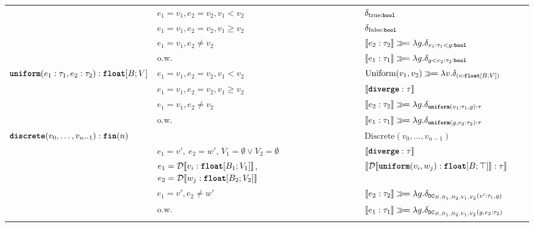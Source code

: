 \begin{table}[t]
\begin{center}
\begin{adjustbox}{width=\textwidth}
\begin{tabular}{l l l l l}
			& $e_1 = v_1, e_2 = v_2, v_1 < v_2 $ & $\delta_{\textnormal{true} : \textnormal{\ttfamily\bfseries bool}}$ \\
			& $e_1 = v_1, e_2 = v_2, v_1 \geq v_2$ & $\delta_{\textnormal{false} : \textnormal{\ttfamily\bfseries bool}}$  \\
			&$e_1 = v_1, e_2 \neq v_2$ & $\llbracket  e_2 : \tau_2  \rrbracket \gg\!= \lambda g. \delta_{ v_1 : \tau_1 < g : \textnormal{\ttfamily\bfseries bool}}$ \\
			& o.w.\ & $\llbracket  e_1 : \tau_1  \rrbracket \gg\!= \lambda g. \delta_{ g < e_2 : \tau_2 : \textnormal{\ttfamily\bfseries bool}}$  \\
			\midrule
			
			& $e_1 = v_1, e_2 = v_2, v_1 < v_2$ & $\text{Uniform}(v_1, v_2) \gg\!= \lambda v. \delta_{(v : \mathnormal{\textnormal{\ttfamily\bfseries float}}[B; V])}$ \\
			& $e_1 = v_1, e_2 = v_2, v_1 \geq v_2$ & $\llbracket \textnormal{\ttfamily\bfseries diverge} : \tau \rrbracket$ \\
			& $e_1 = v_1, e_2 \neq v_2$ & $\llbracket  e_2 : \tau_2  \rrbracket \gg\!= \lambda g. \delta_{ \textnormal{\ttfamily\bfseries uniform}(v_1 : \tau_1, g) : \tau }$ \\
			& o.w.\ & $\llbracket  e_1 : \tau_1  \rrbracket \gg\!= \lambda g. \delta_{ \textnormal{\ttfamily\bfseries uniform}(g, e_2 : \tau_2) : \tau } $ \\
			\midrule
			
			& & $\text{Discrete}{(v_0, \ldots, v_{n-1})}$  \\
			\midrule 
			
			&  & $\llbracket \textnormal{\ttfamily\bfseries diverge} : \tau \rrbracket$ \\
			&  & $\llbracket \mathcal{D}\llbracket \textnormal{\ttfamily\bfseries uniform}(v_i, w_j) : \mathnormal{\textnormal{\ttfamily\bfseries float}}[B; \top] \rrbracket : \tau \rrbracket$ \\
			& $ e_1 = v', e_2 \neq w'$ & $\llbracket  e_2 : \tau_2  \rrbracket \gg\!= \lambda g. \delta_{ \texttt{DC}_{B,B_1,B_2,V_1,V_2}(v' : \tau_1, g) }$ \\
			& o.w.\ & $\llbracket  e_1 : \tau_1  \rrbracket \gg\!= \lambda g. \delta_{ \texttt{DC}_{B,B_1,B_2,V_1,V_2}(g, e_2 : \tau_2) }$ \\
			& & \\
			\bottomrule
			\bottomrule
		\end{tabular}
	\end{adjustbox}
	\end{center}%
\end{table}%

